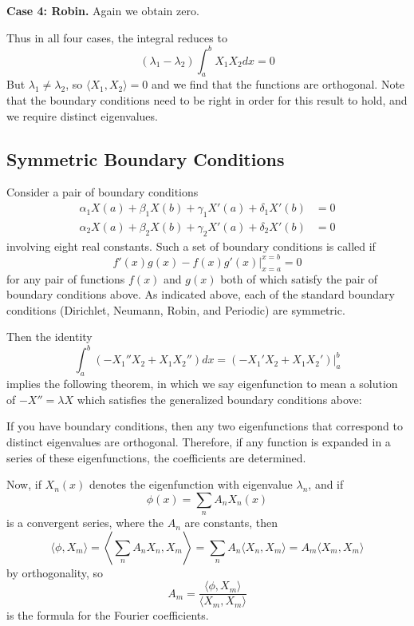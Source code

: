 \textbf{Case 4: Robin.} Again we obtain zero.

Thus in all four cases, the integral reduces to \begin{equation*}
    (\lambda_1-\lambda_2)\int_a^bX_1X_2dx = 0
\end{equation*}
But $\lambda_1 \neq \lambda_2$, so $\langle X_1,X_2\rangle = 0$ and we find that the functions are orthogonal. Note that the boundary conditions need to be right in order for this result to hold, and we require distinct eigenvalues.

\subsection{Symmetric Boundary Conditions}

Consider a pair of boundary conditions \begin{align*}
    \alpha_1X(a)+\beta_1X(b)+\gamma_1X'(a)+\delta_1X'(b) &= 0 \\
    \alpha_2X(a)+\beta_2X(b)+\gamma_2X'(a)+\delta_2X'(b) &= 0
\end{align*}
involving eight real constants. Such a set of boundary conditions is called  if \begin{equation}
    \boxed{f'(x)g(x) - f(x)g'(x)\Bigg\rvert_{x=a}^{x=b} = 0}
\end{equation}
for any pair of functions $f(x)$ and $g(x)$ both of which satisfy the pair of boundary conditions above. As indicated above, each of the standard boundary conditions (Dirichlet, Neumann, Robin, and Periodic) are symmetric.

Then the identity \begin{equation*}
    \int_a^b(-X_1''X_2+X_1X_2'')dx = (-X_1'X_2+X_1X_2')\Bigg\rvert_a^b
\end{equation*}
implies the following theorem, in which we say eigenfunction to mean a solution of $-X''=\lambda X$ which satisfies the generalized boundary conditions above:

\begin{theorem}
    If you have  boundary conditions, then any two eigenfunctions that correspond to distinct eigenvalues are orthogonal. Therefore, if any function is expanded in a series of these eigenfunctions, the coefficients are determined.
\end{theorem}

Now, if $X_n(x)$ denotes the eigenfunction with eigenvalue $\lambda_n$, and if \begin{equation*}
    \phi(x) = \sum_{n}A_nX_n(x)
\end{equation*}
is a convergent series, where the $A_n$ are constants, then \begin{equation*}
    \langle \phi,X_m\rangle = \left\langle\sum_{n}A_nX_n,X_m\right\rangle = \sum_{n}A_n\langle X_n,X_m\rangle = A_m\langle X_m, X_m\rangle
\end{equation*}
by orthogonality, so \begin{equation*}
    A_m = \frac{\langle \phi,X_m\rangle}{\langle X_m,X_m\rangle}
\end{equation*}
is the formula for the Fourier coefficients.

